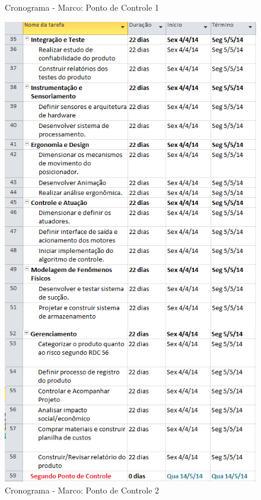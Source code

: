 \begin{figure}[H]
		\caption{Cronograma - Marco: Ponto de Controle 1}
		\label{fig07}
\end{figure}


\begin{figure}[H]
		\centering
			\includegraphics[scale=0.95]{figuras/cronograma2.png}
		\caption{Cronograma - Marco: Ponto de Controle 2}
		\label{fig08}
\end{figure}

